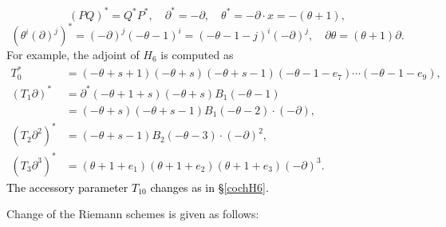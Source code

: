 \documentclass[a4paper,12pt]{article}
\theoremstyle{definition}
\theoremstyle{remark}
\numberwithin{equation}{section} %
\newcommand{\blue}[1]{\textcolor{black}{#1}}
\begin{document}
$$(PQ)^*=Q^*P^*,\quad \partial^*=-\partial,\quad \theta^*=-\partial\cdot x=-(\theta+1),$$
$$(\theta^i(\partial)^j)^*=(-\partial)^j(-\theta-1)^i=(-\theta-1-j)^i(-\partial)^j,\quad \partial\theta=(\theta+1)\partial.$$
For example, the adjoint of $H_6$ is computed as
$$\begin{array}{ll}
  T_0^*&=(-\theta+s+1)(-\theta+s)(-\theta+s-1)(-\theta-1-e_7)\cdots(-\theta-1-e_9),\\
  (T_1\partial )^*&=\partial^*(-\theta+1+s)(-\theta+s)B_1(-\theta-1)\\&=(-\theta+s)(-\theta+s-1)B_1(-\theta-2)\cdot(-\partial ),\\
(T_2\partial ^2)^*&=(-\theta+s-1)B_2(-\theta-3)\cdot(-\partial )^2,\\
  (T_3\partial ^3)^*&=(\theta+1+e_1) (\theta+1+e_2) (\theta+1+e_3)(-\partial )^3.\end{array}$$
\blue{The accessory parameter $T_{10}$ changes as in \S \ref{cochH6}.}%
\par\medskip
  Change of the Riemann schemes is given as follows:%
\end{document}
